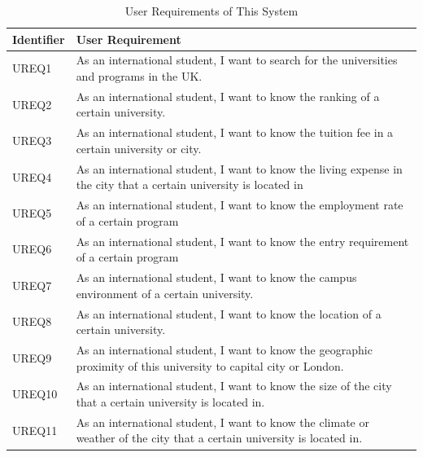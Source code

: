 \begin{table}[H]
\centering
\caption{User Requirements of This System
}
\label{my-label}
\begin{tabular}{|p{2cm}|p{11cm}|}
\hline
\textbf{Identifier} & \textbf{User Requirement}                                                                                                               \\ \hline
UREQ1               & As an international student, I want to search for the universities and programs in the UK.                                              \\ \hline
UREQ2               & As an international student, I want to know the ranking of a certain university.                                                        \\ \hline
UREQ3               & As an international student, I want to know the tuition fee in a certain university or city.                                            \\ \hline
UREQ4               & As an international student, I want to know the living expense in the city that a certain university is located in                      \\ \hline
UREQ5               & As an international student, I want to know the employment rate of a certain program                                                    \\ \hline
UREQ6               & As an international student, I want to know the entry requirement of a certain program                                                  \\ \hline
UREQ7               & As an international student, I want to know the campus environment of a certain university.                                             \\ \hline
UREQ8               & As an international student, I want to know the location of a certain university.                                                       \\ \hline
UREQ9               & As an international student, I want to know the geographic proximity of this university to capital city or London.                      \\ \hline
UREQ10              & As an international student, I want to know the size of the city that a certain university is located in.                               \\ \hline
UREQ11              & As an international student, I want to know the climate or weather of the city that a certain university is located in.                 \\ \hline

\end{tabular}
\end{table}
